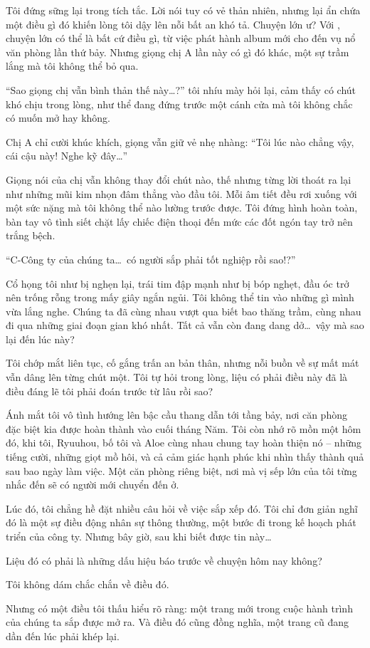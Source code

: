 \documentclass[../main.tex]{subfiles}
\begin{document}
Tôi đứng sững lại trong tích tắc. Lời nói tuy có vẻ thản nhiên, nhưng lại ẩn chứa một điều gì đó khiến lòng tôi dậy lên nỗi bất an khó tả. Chuyện lớn ư? Với \hll, chuyện lớn có thể là bất cứ điều gì, từ việc phát hành album mới cho đến vụ nổ văn phòng lần thứ bảy. Nhưng giọng chị A lần này có gì đó khác, một sự trầm lắng mà tôi không thể bỏ qua.

``Sao giọng chị vẫn bình thản thế này\dots?'' tôi nhíu mày hỏi lại, cảm thấy có chút khó chịu trong lòng, như thể đang đứng trước một cánh cửa mà tôi không chắc có muốn mở hay không.

Chị A chỉ cười khúc khích, giọng vẫn giữ vẻ nhẹ nhàng: ``Tôi lúc nào chẳng vậy, cái cậu này! Nghe kỹ đây\dots''

Giọng nói của chị vẫn không thay đổi chút nào, thế nhưng từng lời thoát ra lại như những mũi kim nhọn đâm thẳng vào đầu tôi. Mỗi âm tiết đều rơi xuống với một sức nặng mà tôi không thể nào lường trước được. Tôi đứng hình hoàn toàn, bàn tay vô tình siết chặt lấy chiếc điện thoại đến mức các đốt ngón tay trở nên trắng bệch.

``C-Công ty của chúng ta\dots\ có người sắp phải tốt nghiệp rồi sao!?''

Cổ họng tôi như bị nghẹn lại, trái tim đập mạnh như bị bóp nghẹt, đầu óc trở nên trống rỗng trong mấy giây ngắn ngủi. Tôi không thể tin vào những gì mình vừa lắng nghe. Chúng ta đã cùng nhau vượt qua biết bao thăng trầm, cùng nhau đi qua những giai đoạn gian khó nhất. Tất cả vẫn còn đang dang dở\dots\ vậy mà sao lại đến lúc này?

Tôi chớp mắt liên tục, cố gắng trấn an bản thân, nhưng nỗi buồn về sự mất mát vẫn dâng lên từng chút một. Tôi tự hỏi trong lòng, liệu có phải điều này đã là điều đáng lẽ tôi phải đoán trước từ lâu rồi sao?

Ánh mắt tôi vô tình hướng lên bậc cầu thang dẫn tới tầng bảy, nơi căn phòng đặc biệt kia được hoàn thành vào cuối tháng Năm. Tôi còn nhớ rõ mồn một hôm đó, khi tôi, Ryuuhou, bố tôi và Aloe cùng nhau chung tay hoàn thiện nó – những tiếng cười, những giọt mồ hôi, và cả cảm giác hạnh phúc khi nhìn thấy thành quả sau bao ngày làm việc. Một căn phòng riêng biệt, nơi mà vị sếp lớn của tôi từng nhắc đến sẽ có người mới chuyển đến ở.

Lúc đó, tôi chẳng hề đặt nhiều câu hỏi về việc sắp xếp đó. Tôi chỉ đơn giản nghĩ đó là một sự điều động nhân sự thông thường, một bước đi trong kế hoạch phát triển của công ty. Nhưng bây giờ, sau khi biết được tin này\dots

Liệu đó có phải là những dấu hiệu báo trước về chuyện hôm nay không?

Tôi không dám chắc chắn về điều đó.

Nhưng có một điều tôi thấu hiểu rõ ràng: một trang mới trong cuộc hành trình của chúng ta sắp được mở ra. Và điều đó cũng đồng nghĩa, một trang cũ đang dần đến lúc phải khép lại.
\end{document}
